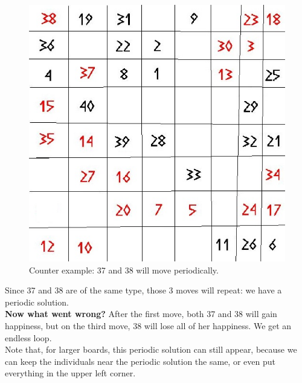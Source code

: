 \begin{figure}[h!]
\begin{center}
\includegraphics[scale=0.25]{Tegenvoorbeeld/segregation_tegenvb_3.jpg}
\end{center}
\caption{Counter example: 37 and 38 will move periodically.}\label{counterexample3}
\end{figure}
Since 37 and 38 are of the same type, those 3 moves will repeat: we have a periodic solution.\\
\textbf{Now what went wrong?} After the first move, both 37 and 38 will gain happiness, but on the third move, 38 will lose all of her happiness. We get an endless loop.\\
Note that, for larger boards, this periodic solution can still appear, because we can keep the individuals near the periodic solution the same, or even put everything in the upper left corner.
